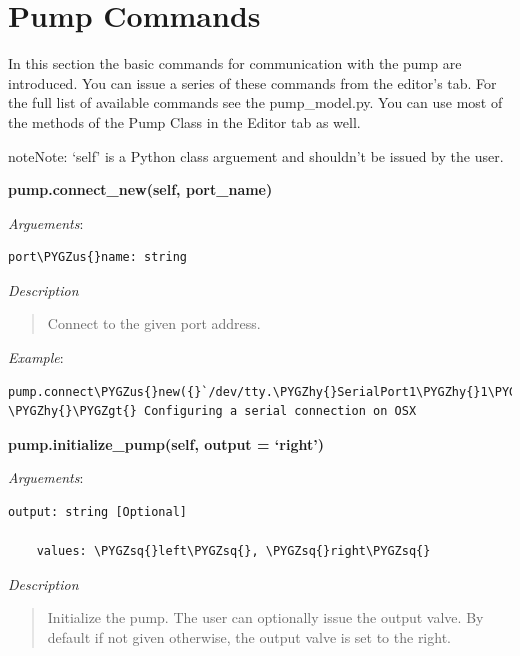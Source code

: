 \documentclass[letterpaper,10pt,english]{sphinxmanual}
\def\PYGZus{\char`\_}
\def\PYGZgt{\char`\>}
\def\PYGZhy{\char`\-}
\def\PYGZsq{\char`\'}
\begin{document}
\section{Pump Commands}
\label{pump-commands:pump-commands}\label{pump-commands::doc}
In this section the basic commands for communication with the pump are introduced.
You can issue a series of these commands from the editor's tab.
For the full list of available commands see the pump\_model.py. You can use most
of the methods of the Pump Class in the Editor tab as well.

\begin{notice}{note}{Note:}
`self' is a Python class arguement and shouldn't be issued by the user.
\end{notice}

\textbf{pump.connect\_new(self, port\_name)}

\emph{Arguements}:

\begin{Verbatim}[commandchars=\\\{\}]
port\PYGZus{}name: string
\end{Verbatim}

\emph{Description}
\begin{quote}

Connect to the given port address.
\end{quote}

\emph{Example}:

\begin{Verbatim}[commandchars=\\\{\}]
pump.connect\PYGZus{}new({}`/dev/tty.\PYGZhy{}SerialPort1\PYGZhy{}1\PYGZsq{}) \PYGZhy{}\PYGZgt{} Configuring a serial connection on OSX
\end{Verbatim}

\textbf{pump.initialize\_pump(self, output = `right')}

\emph{Arguements}:

\begin{Verbatim}[commandchars=\\\{\}]
output: string [Optional]

    values: \PYGZsq{}left\PYGZsq{}, \PYGZsq{}right\PYGZsq{}
\end{Verbatim}

\emph{Description}
\begin{quote}

Initialize the pump. The user can optionally issue the output valve. By default if not
given otherwise, the output valve is set to the right.
\end{quote}
\end{document}
